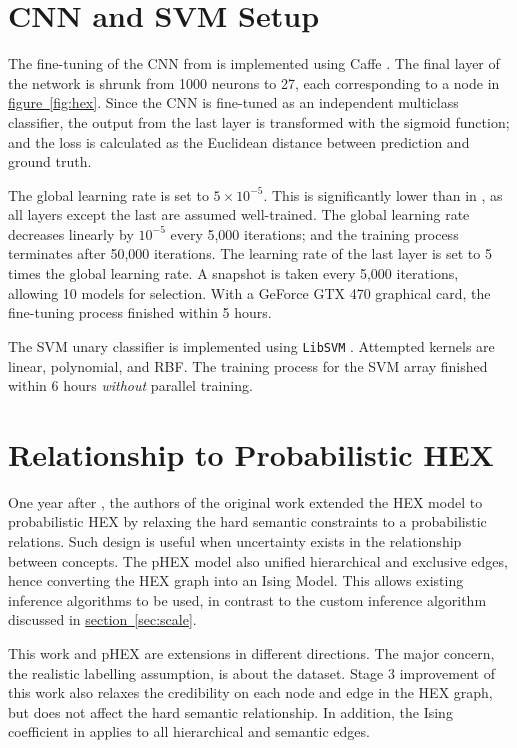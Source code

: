 \documentclass[11pt,a4paper]{article}
\begin{document}
\section{CNN and SVM Setup}
\label{sec:setup}

The fine-tuning of the CNN from \cite{krizhevsky2012imagenet} is implemented using Caffe \cite{jia2014caffe}. The final layer of the network is shrunk from 1000 neurons to 27, each corresponding to a node in \hyperref[fig:hex]{figure~\ref{fig:hex}}. Since the CNN is fine-tuned as an independent multiclass classifier, the output from the last layer is transformed with the sigmoid function; and the loss is calculated as the Euclidean distance between prediction and ground truth.

The global learning rate is set to $5\times10^{-5}$. This is significantly lower than in \cite{krizhevsky2012imagenet}, as all layers except the last are assumed well-trained. The global learning rate decreases linearly by $10^{-5}$ every 5,000 iterations; and the training process terminates after 50,000 iterations. The learning rate of the last layer is set to 5 times the global learning rate. A snapshot is taken every 5,000 iterations, allowing 10 models for selection. With a GeForce GTX 470 graphical card, the fine-tuning process finished within 5 hours.

The SVM unary classifier is implemented using \texttt{LibSVM} \cite{libsvm}. Attempted kernels are linear, polynomial, and RBF. The training process for the SVM array finished within 6 hours \emph{without} parallel training.

\section{Relationship to Probabilistic HEX}

One year after \cite{deng2014large}, the authors of the original work extended the HEX model to probabilistic HEX \cite{ding2015probabilistic} by relaxing the hard semantic constraints to a probabilistic relations. Such design is useful when uncertainty exists in the relationship between concepts. The pHEX model also unified hierarchical and exclusive edges, hence converting the HEX graph into an Ising Model. This allows existing inference algorithms to be used, in contrast to the custom inference algorithm discussed in \hyperref[sec:scale]{section~\ref{sec:scale}}.

This work and pHEX are extensions in different directions. The major concern, the realistic labelling assumption, is about the dataset. Stage 3 improvement of this work also relaxes the credibility on each node and edge in the HEX graph, but does not affect the hard semantic relationship. In addition, the Ising coefficient in \cite{ding2015probabilistic} applies to all hierarchical and semantic edges.
\end{document}
